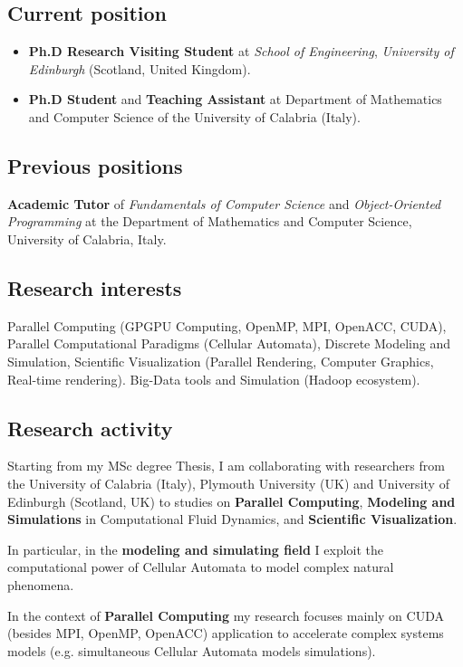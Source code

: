 \documentclass[a4paper,10pt]{article}
\begin{document}
 
\subsection{Current position}
\begin{itemize}
 
  \item \textbf{Ph.D Research Visiting Student} at \textit{School of
  Engineering}, \textit{University of Edinburgh} (Scotland, United Kingdom).
  \item \textbf{Ph.D Student} and \textbf{Teaching Assistant}  at Department of Mathematics and Computer Science
  of the University of Calabria (Italy).
\end{itemize}

\subsection{Previous positions}
\textbf{Academic Tutor} of  \textit{Fundamentals of Computer Science} and
\textit{Object-Oriented Programming} at the Department of Mathematics and
Computer Science, University of Calabria, Italy.


\subsection{Research interests}
Parallel Computing (GPGPU Computing, OpenMP, MPI, OpenACC, CUDA),
Parallel Computational Paradigms (Cellular Automata), Discrete Modeling and
Simulation, Scientific Visualization (Parallel Rendering, Computer Graphics,
Real-time rendering). Big-Data tools and Simulation (Hadoop ecosystem). 

\subsection{Research activity}
Starting from my MSc degree Thesis, I am collaborating with researchers from the
University of Calabria (Italy), Plymouth University (UK) and University of
Edinburgh (Scotland, UK) to studies on \textbf{Parallel Computing},
\textbf{Modeling and Simulations} in Computational Fluid Dynamics, and
\textbf{Scientific Visualization}.

In particular, in the \textbf{modeling and simulating field} I exploit the
computational power of Cellular Automata to model complex natural phenomena.

In the context of \textbf{Parallel Computing} my research focuses mainly on CUDA
(besides MPI, OpenMP, OpenACC) application to accelerate complex systems models
(e.g. simultaneous Cellular Automata models simulations).
\end{document}
